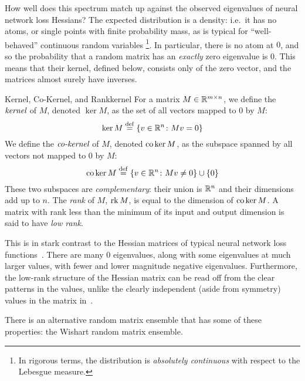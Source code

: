\documentclass[../../thesis.tex]{subfiles}
\begin{document}
How well does this spectrum match up against the observed eigenvalues
of neural network loss Hessians?
The expected distribution is a density:
i.e.~it has no atoms, or single points with finite probability mass,
as is typical for \enquote{well-behaved} continuous random variables%
\footnote{In rigorous terms, the distribution is
\emph{absolutely continuous} with respect to the Lebesgue measure.}.
In particular, there is no atom at $0$,
and so the probability that a random matrix has an \emph{exactly}
zero eigenvalue is $0$.
This means that their kernel, defined below, consists only of the zero vector,
and the matrices almost surely have inverses.

\begin{definition}{Kernel, Co-Kernel, and Rank}{kernel}
	For a matrix $M\in\mathbb{R}^{m\times n}$,
	we define the $\emph{kernel}$ of $M$,
	denoted $\ker M$,
	as the set of all vectors mapped to $0$ by $M$:
	\begin{equation}\equationlabel{def-ker}
		\ker M \defeq \Set{v \in \R^n \suchthat Mv = 0}
	\end{equation}
	We define the $\emph{co-kernel}$ of $M$,
	denoted $\operatorname*{co}\ker M$,
	as the subspace spanned by all vectors not mapped to $0$ by $M$:
	\begin{equation}\equationlabel{def-coker}
		\co\ker M \defeq \Set{v \in \R^n \suchthat Mv \neq 0} \cup \Set{0}
	\end{equation}
	These two subspaces are \emph{complementary}:
	their union is $\mathbb{R}^n$
	and their dimensions add up to $n$.
	The \emph{rank} of $M$, $\operatorname*{rk} M$,
	is equal to the dimension of $\operatorname*{co}\ker M$.
	A matrix with rank less than the minimum
	of its input and output dimension
	is said to have \emph{low rank}.
\end{definition}

This is in stark contrast to the Hessian matrices
of typical neural network loss functions~\cite{sagun2017}.
There are many $0$ eigenvalues,
along with some eigenvalues at much larger values,
with fewer and lower magnitude negative eigenvalues.
Furthermore, the low-rank structure of the Hessian matrix
can be read off from the clear patterns in the values,
unlike the clearly independent (aside from symmetry) values
in the matrix in~.

There is an alternative random matrix ensemble
that has some of these properties:
the Wishart random matrix ensemble.
\end{document}
